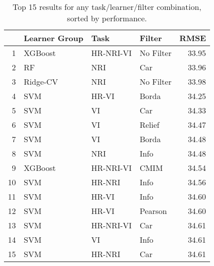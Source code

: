 \begin{table}[ht!]
\centering
\caption{Top 15 results for any task/learner/filter combination, sorted by performance.} 
\label{tab:perf-top-15}
\begin{tabular}{rlllr}
  \hline
 & Learner Group & Task & Filter & RMSE \\ 
  \hline
1 & XGBoost & HR-NRI-VI & No Filter & 33.95 \\ 
  2 & RF & NRI & Car & 33.96 \\ 
  3 & Ridge-CV & NRI & No Filter & 33.98 \\ 
  4 & SVM & HR-VI & Borda & 34.25 \\ 
  5 & SVM & VI & Car & 34.33 \\ 
  6 & SVM & VI & Relief & 34.47 \\ 
  7 & SVM & VI & Borda & 34.48 \\ 
  8 & SVM & NRI & Info & 34.48 \\ 
  9 & XGBoost & HR-NRI-VI & CMIM & 34.54 \\ 
  10 & SVM & HR-NRI & Info & 34.56 \\ 
  11 & SVM & HR-VI & Info & 34.60 \\ 
  12 & SVM & HR-VI & Pearson & 34.60 \\ 
  13 & SVM & HR-NRI-VI & Car & 34.61 \\ 
  14 & SVM & VI & Info & 34.61 \\ 
  15 & SVM & HR-NRI & Car & 34.61 \\ 
   \hline
\end{tabular}
\end{table}
